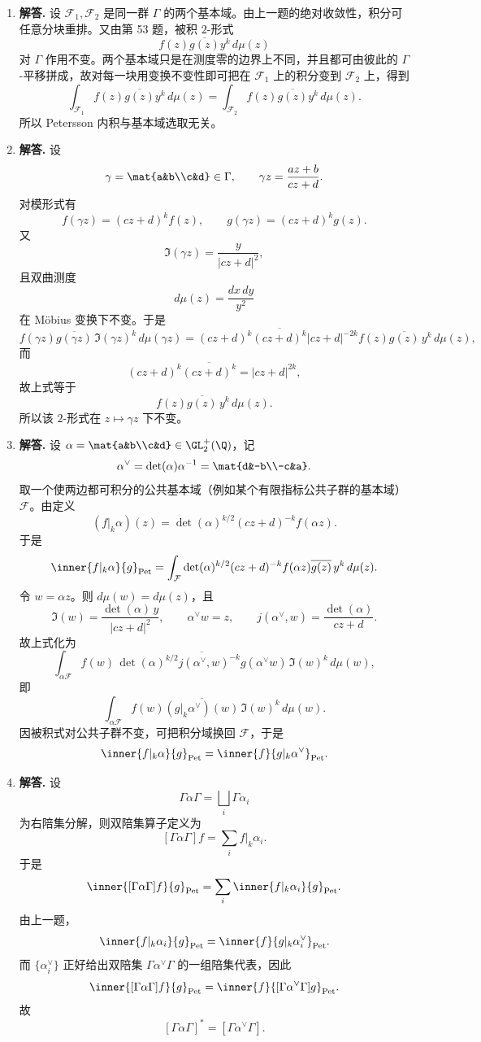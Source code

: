 \begin{enumerate}[label=\textbf{\arabic*.}, leftmargin=*, itemsep=1em]
\item \textbf{解答.} 设 $\mathcal F_1,\mathcal F_2$ 是同一群 $\Gamma$ 的两个基本域。由上一题的绝对收敛性，积分可任意分块重排。又由第 53 题，被积 $2$-形式
\[
f(z)\overline{g(z)}y^k\,d\mu(z)
\]
对 $\Gamma$ 作用不变。两个基本域只是在测度零的边界上不同，并且都可由彼此的 $\Gamma$-平移拼成，故对每一块用变换不变性即可把在 $\mathcal F_1$ 上的积分变到 $\mathcal F_2$ 上，得到
\[
\int_{\mathcal F_1} f(z)\overline{g(z)}y^k\,d\mu(z)
=
\int_{\mathcal F_2} f(z)\overline{g(z)}y^k\,d\mu(z).
\]
所以 Petersson 内积与基本域选取无关。

\item \textbf{解答.} 设
\[
\gamma=\mat{a&b\\c&d}\in\Gamma,\qquad \gamma z=\frac{az+b}{cz+d}.
\]
对模形式有
\[
f(\gamma z)=(cz+d)^k f(z),\qquad g(\gamma z)=(cz+d)^k g(z).
\]
又
\[
\Im(\gamma z)=\frac{y}{|cz+d|^2},
\]
且双曲测度
\[
d\mu(z)=\frac{dx\,dy}{y^2}
\]
在 Möbius 变换下不变。于是
\[
f(\gamma z)\overline{g(\gamma z)}\,\Im(\gamma z)^k\,d\mu(\gamma z)
=(cz+d)^k\overline{(cz+d)^k}|cz+d|^{-2k}
f(z)\overline{g(z)}\,y^k\,d\mu(z),
\]
而
\[
(cz+d)^k\overline{(cz+d)^k}=|cz+d|^{2k},
\]
故上式等于
\[
f(z)\overline{g(z)}\,y^k\,d\mu(z).
\]
所以该 $2$-形式在 $z\mapsto \gamma z$ 下不变。

\item \textbf{解答.} 设 $\alpha=\mat{a&b\\c&d}\in \GL_2^+(\Q)$，记
\[
\alpha^\vee=\det(\alpha)\alpha^{-1}=\mat{d&-b\\-c&a}.
\]
取一个使两边都可积分的公共基本域（例如某个有限指标公共子群的基本域）$\mathcal F$。由定义
\[
(f|_k\alpha)(z)=\det(\alpha)^{k/2}(cz+d)^{-k}f(\alpha z).
\]
于是
\[
\inner{f|_k\alpha}{g}_{\mathrm{Pet}}
=\int_{\mathcal F}\det(\alpha)^{k/2}(cz+d)^{-k}f(\alpha z)\overline{g(z)}\,y^k\,d\mu(z).
\]
令 $w=\alpha z$。则 $d\mu(w)=d\mu(z)$，且
\[
\Im(w)=\frac{\det(\alpha)\,y}{|cz+d|^2},
\qquad
\alpha^\vee w=z,
\qquad
j(\alpha^\vee,w)=\frac{\det(\alpha)}{cz+d}.
\]
故上式化为
\[
\int_{\alpha\mathcal F} f(w)\,
\overline{\det(\alpha)^{k/2}j(\alpha^\vee,w)^{-k}g(\alpha^\vee w)}
\,\Im(w)^k\,d\mu(w),
\]
即
\[
\int_{\alpha\mathcal F} f(w)\overline{(g|_k\alpha^\vee)(w)}\,\Im(w)^k\,d\mu(w).
\]
因被积式对公共子群不变，可把积分域换回 $\mathcal F$，于是
\[
\inner{f|_k \alpha}{g}_{\mathrm{Pet}}
=
\inner{f}{g|_k \alpha^\vee}_{\mathrm{Pet}}.
\]

\item \textbf{解答.} 设
\[
\Gamma\alpha\Gamma=\bigsqcup_i \Gamma\alpha_i
\]
为右陪集分解，则双陪集算子定义为
\[
[\Gamma\alpha\Gamma]f=\sum_i f|_k\alpha_i.
\]
于是
\[
\inner{[\Gamma\alpha\Gamma]f}{g}_{\mathrm{Pet}}
=\sum_i \inner{f|_k\alpha_i}{g}_{\mathrm{Pet}}.
\]
由上一题，
\[
\inner{f|_k\alpha_i}{g}_{\mathrm{Pet}}
=\inner{f}{g|_k\alpha_i^\vee}_{\mathrm{Pet}}.
\]
而 $\{\alpha_i^\vee\}$ 正好给出双陪集 $\Gamma\alpha^\vee\Gamma$ 的一组陪集代表，因此
\[
\inner{[\Gamma\alpha\Gamma]f}{g}_{\mathrm{Pet}}
=
\inner{f}{[\Gamma\alpha^\vee\Gamma]g}_{\mathrm{Pet}}.
\]
故
\[
[\Gamma\alpha\Gamma]^*=[\Gamma\alpha^\vee\Gamma].
\]


\end{enumerate}
